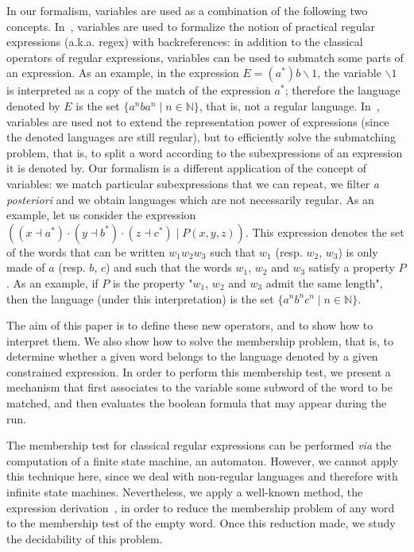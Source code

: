 \documentclass[a4paper]{llncs}
\begin{document}
    
  In our formalism, variables are used as a combination of the following two concepts.
  In~\cite{CSY03}, variables are used to formalize the notion of practical regular expressions (a.k.a. regex) with backreferences: in addition to the classical operators of regular expressions, variables can be used to submatch some parts of an expression. As an example, in the expression $E=(a^*)b\backslash 1$, the variable $\backslash 1$ is interpreted as a copy of the match of the expression $a^*$; therefore the language denoted by $E$ is the set $\{a^nba^n\mid n\in\mathbb{N}\}$, that is, not a regular language.
  In~\cite{SL12}, variables are used not to extend the representation power of expressions (since the denoted languages are still regular), but to efficiently solve the submatching problem, that is, to split a word according to the subexpressions of an expression it is denoted by.
  Our formalism is a different application of the concept of variables: we match particular subexpressions that we can repeat, we filter \emph{a posteriori} and we obtain languages which are not necessarily regular. As an example, let us consider the expression $((x\dashv a^*)\cdot (y\dashv b^*)\cdot (z\dashv c^*) \mid P(x,y,z) )$. This expression denotes the set of the words that can be written $w_1 w_2 w_3$ such that $w_1$ (resp. $w_2$, $w_3$) is only made of $a$ (resp. $b$, $c$) and such that the words $w_1$, $w_2$ and $w_3$ satisfy a property $P$. As an example, if $P$ is the property "$w_1$, $w_2$ and $w_3$ admit the same length", then the language (under this interpretation) is the set $\{a^nb^nc^n\mid n\in\mathbb{N}\}$.

  The aim of this paper is to define these new operators, and to show how to interpret them. We also show how to solve the membership problem, that is, to determine whether a given word belongs to the language denoted by a given constrained expression. 
  In order to perform this membership test, we present a mechanism that first associates to the variable some subword of the word to be matched, and then evaluates the boolean formula that may appear during the run.
  
  The membership test for classical regular expressions can be performed \emph{via} the computation of a finite state machine, an automaton. However, we cannot apply this technique here, since we deal with non-regular languages and therefore with infinite state machines. Nevertheless, we apply a well-known method, the expression derivation~\cite{Ant96,Brz64}, in order to reduce the membership problem of any word to the membership test of the empty word. Once this reduction made, we study the decidability of this problem.
  
\end{document}
